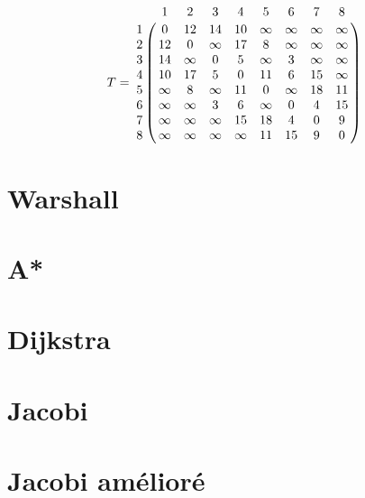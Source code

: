 \documentclass{article}
\begin{document}
$$
T = \bordermatrix{
    & 1 & 2 & 3 & 4 & 5 & 6 & 7 & 8 \cr
  1 & 0 & 12 & 14 & 10 & \infty & \infty & \infty & \infty \cr
  2 & 12 & 0 & \infty & 17 & 8 & \infty & \infty & \infty \cr
  3 & 14 & \infty & 0 & 5 & \infty & 3 & \infty & \infty \cr
  4 & 10 & 17 & 5 & 0 & 11 & 6 & 15 & \infty \cr
  5 & \infty & 8 & \infty & 11 & 0 & \infty & 18 & 11 \cr
  6 & \infty & \infty & 3 & 6 & \infty & 0 & 4 & 15 \cr
  7 & \infty & \infty & \infty & 15 & 18 & 4 & 0 & 9 \cr
  8 & \infty & \infty & \infty & \infty & 11 & 15 & 9 & 0
}
$$

\section{Warshall}

\section{A*}

\section{Dijkstra}

\section{Jacobi}

\section{Jacobi amélioré}
\end{document}
